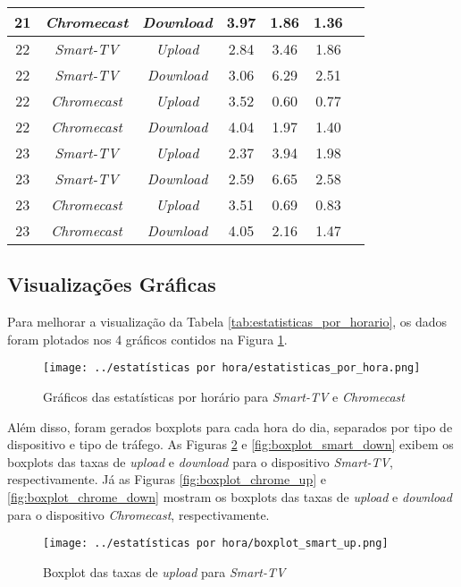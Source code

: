 \begin{longtable}{|c|c|c|c|c|c|c|}
    21 & \textit{Chromecast} & \textit{Download} & 3.97 & 1.86 & 1.36 \\
    \hline
    22 & \textit{Smart-TV} & \textit{Upload} & 2.84 & 3.46 & 1.86 \\
    22 & \textit{Smart-TV} & \textit{Download} & 3.06 & 6.29 & 2.51 \\
    22 & \textit{Chromecast} & \textit{Upload} & 3.52 & 0.60 & 0.77 \\
    22 & \textit{Chromecast} & \textit{Download} & 4.04 & 1.97 & 1.40 \\
    \hline
    23 & \textit{Smart-TV} & \textit{Upload} & 2.37 & 3.94 & 1.98 \\
    23 & \textit{Smart-TV} & \textit{Download} & 2.59 & 6.65 & 2.58 \\
    23 & \textit{Chromecast} & \textit{Upload} & 3.51 & 0.69 & 0.83 \\
    23 & \textit{Chromecast} & \textit{Download} & 4.05 & 2.16 & 1.47 \\
    \hline
        
\end{longtable}

\subsection{Visualizações Gráficas}

Para melhorar a visualização da Tabela \ref{tab:estatisticas_por_horario}, os dados foram plotados nos 4 gráficos contidos na Figura \ref{fig:estatisticas_por_hora}.

\begin{figure}[H]
    \centering
    \texttt{[image: ../estatísticas por hora/estatisticas\_por\_hora.png]}
    \caption{Gráficos das estatísticas por horário para \textit{Smart-TV} e \textit{Chromecast}}
    \label{fig:estatisticas_por_hora}
\end{figure}

Além disso, foram gerados boxplots para cada hora do dia, separados por tipo de dispositivo e tipo de tráfego. As Figuras \ref{fig:boxplot_smart_up} e \ref{fig:boxplot_smart_down} exibem os boxplots das taxas de \textit{upload} e \textit{download} para o dispositivo \textit{Smart-TV}, respectivamente. Já as Figuras \ref{fig:boxplot_chrome_up} e \ref{fig:boxplot_chrome_down} mostram os boxplots das taxas de \textit{upload} e \textit{download} para o dispositivo \textit{Chromecast}, respectivamente.

\begin{figure}[H]
    \centering
    \texttt{[image: ../estatísticas por hora/boxplot\_smart\_up.png]}
    \caption{Boxplot das taxas de \textit{upload} para \textit{Smart-TV}}
    \label{fig:boxplot_smart_up}
\end{figure}

